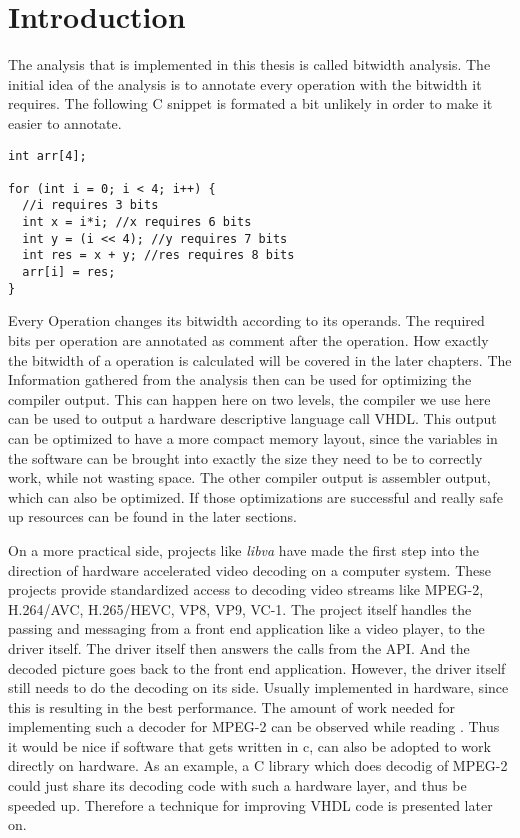 \chapter{Introduction}\label{sec:intro}

The analysis that is implemented in this thesis is called bitwidth analysis.
The initial idea of the analysis is to annotate every operation with the bitwidth it requires. The following C snippet is formated a bit unlikely in order to make it easier to annotate.
\begin{lstlisting}[frame=single]
int arr[4];

for (int i = 0; i < 4; i++) {
  //i requires 3 bits
  int x = i*i; //x requires 6 bits
  int y = (i << 4); //y requires 7 bits
  int res = x + y; //res requires 8 bits
  arr[i] = res;
}
\end{lstlisting}
Every Operation changes its bitwidth according to its operands. The required bits per operation are annotated as comment after the operation.
How exactly the bitwidth of a operation is calculated will be covered in the later chapters.
The Information gathered from the analysis then can be used for optimizing the compiler output. This can happen here on two levels, the compiler we use here can be used to output a hardware descriptive language call VHDL. This output can be optimized to have a more compact memory layout, since the variables in the software can be brought into exactly the size they need to be to correctly work, while not wasting space.
The other compiler output is assembler output, which can also be optimized. If those optimizations are successful and really safe up resources can be found in the later sections.

On a more practical side, projects like \textit{libva} have made the first step into the direction of hardware accelerated video decoding on a computer system. These projects provide standardized access to decoding video streams like MPEG-2, H.264/AVC, H.265/HEVC, VP8, VP9, VC-1. The project itself handles the passing and messaging from a front end application like a video player, to the driver itself. The driver itself then answers the calls from the API. And the decoded picture goes back to the front end application. However, the driver itself still needs to do the decoding on its side. Usually implemented in hardware, since this is resulting in the best performance. The amount of work needed for implementing such a decoder for MPEG-2 can be observed while reading \cite{mpeg2-modelling}.
Thus it would be nice if software that gets written in c, can also be adopted to work directly on hardware. As an example, a C library which does decodig of MPEG-2 could just share its decoding code with such a hardware layer, and thus be speeded up. Therefore a technique for improving VHDL code is presented later on.